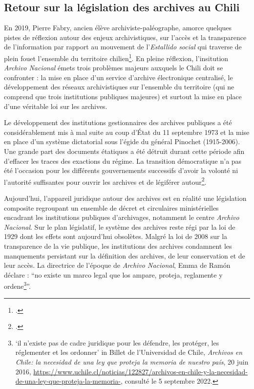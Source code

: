 	\subsection{Retour sur la législation des archives au Chili}
	
	En 2019, Pierre Fabry, ancien élève archiviste-paléographe, amorce quelques pistes de réflexion autour des enjeux archivistiques, sur l'accès et la transparence de l'information par rapport au mouvement de l'\textit{Estallido social} qui traverse de plein fouet l'ensemble du territoire chilien\footcite{fabryArchivesArchivistesCrise2020}. En pleine réflexion, l'insitution \textit{Archivo Nacional} émets trois problèmes majeurs auxquels le Chili doit se confronter : la mise en place d'un service d'archive électronique centralisé, le développement  des réseaux archivistiques sur l'ensemble du territoire (qui ne comprend que trois institutions publiques majeures) et surtout la mise en place d'une véritable loi sur les archives.
	
	Le développement des institutions gestionnaires des archives publiques a été considérablement mis à mal suite au coup d'État du 11 septembre 1973 et la mise en place d'un système dictatorial sous l'égide du général Pinochet (1915-2006). Une grande part des documents étatiques a été détruit durant cette période afin d'effacer les traces des exactions du régime. La transition démocratique n'a pas été l'occasion pour les différents gouvernements successifs d'avoir la volonté ni l’autorité suffisantes pour ouvrir les archives et de légiférer autour\footcite{groppoChapitreArchivesDroits2020}.
	
	Aujourd'hui, l'appareil juridique autour des archives est en réalité une législation composite regroupant un ensemble de décret et circulaires ministérielles  encadrant les institutions publiques d'archivages, notamment le centre \textit{Archivo Nacional}. Sur le plan législatif, le système des archives reste régi par la loi de 1929 dont les effets sont aujourd'hui obsolètes. Malgré la loi de 2008 sur la transparence de la vie publique, les institutions des archives condamnent les manquements persistant sur la définition des archives, de leur conservation et de leur accès. La directrice de l'époque de \textit{Archivo Nacional}, Emma de Ramón déclare : \enquote{no existe un marco legal que los ampare, proteja, reglamente y ordene\footnote{\enquote{il n'existe pas de cadre juridique pour les défendre, les protéger, les réglementer et les ordonner} in Billet de l'Universidad de Chile, \textit{Archivos en Chile: la necesidad de una ley que proteja la memoria de nuestro país}, 20 juin 2016, \url{https://www.uchile.cl/noticias/122827/archivos-en-chile-y-la-necesidad-de-una-ley-que-proteja-la-memoria-}, consulté le 5 septembre 2022.}}.
	
